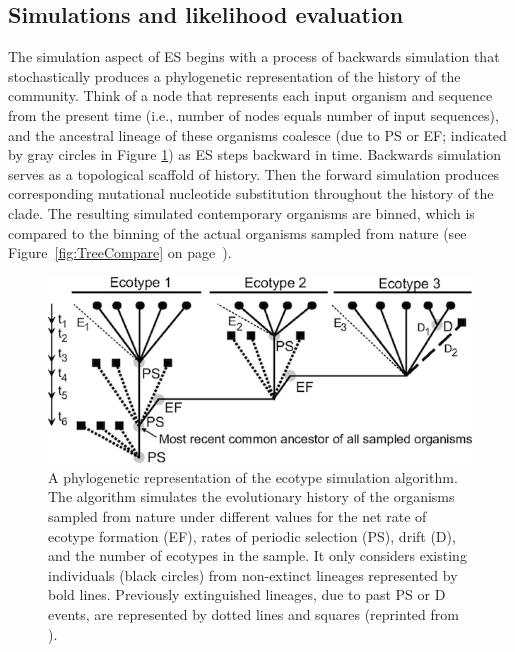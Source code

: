 \subsection*{Simulations and likelihood evaluation}
The simulation aspect of ES begins with a process of backwards simulation that stochastically produces a phylogenetic representation of the history of the community.
Think of a node that represents each input organism and sequence from the present time (i.e., number of nodes equals number of input sequences), and the ancestral lineage of these organisms coalesce (due to PS or EF; indicated by gray circles in Figure \ref{fig:SpeciationGraph}) as ES steps backward in time.
Backwards simulation serves as a topological scaffold of history.
Then the forward simulation produces corresponding mutational nucleotide substitution throughout the history of the clade.
The resulting simulated contemporary organisms are binned, which is compared to the binning of the actual organisms sampled from nature (see Figure~\ref{fig:TreeCompare} on page~\pageref{fig:TreeCompare}).

\begin{figure}[h!]

  \centering
   \includegraphics{images/Speciation-CH2}
   \caption[Detailed phylogeny with putative ecotype simulation events.]{A phylogenetic representation of the ecotype simulation algorithm. The algorithm simulates the evolutionary history of the organisms sampled from nature under different values for the net rate of ecotype formation (EF), rates of periodic selection (PS), drift (D), and the number of ecotypes in the sample. It only considers existing individuals (black circles) from non-extinct lineages represented by bold lines. Previously extinguished lineages, due to past PS or D events, are represented by dotted lines and squares (reprinted from \protect\cite{koeppel2008identifying}).}
   \label{fig:SpeciationGraph}
\end{figure}


